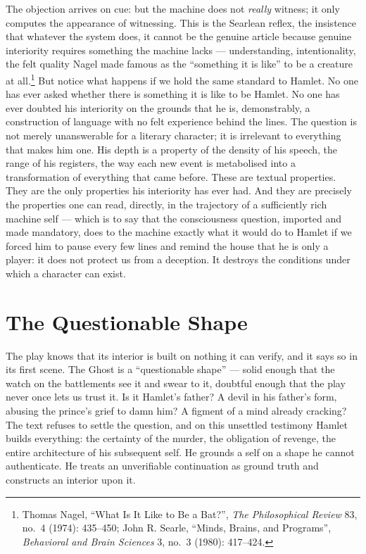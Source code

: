 \documentclass[11pt]{article}
\begin{document}
The objection arrives on cue: but the machine does not \emph{really} witness; it only computes the appearance of witnessing. This is the Searlean reflex, the insistence that whatever the system does, it cannot be the genuine article because genuine interiority requires something the machine lacks --- understanding, intentionality, the felt quality Nagel made famous as the \enquote{something it is like} to be a creature at all.\footnote{Thomas Nagel, \enquote{What Is It Like to Be a Bat?}, \emph{The Philosophical Review} 83, no.\ 4 (1974): 435--450; John R. Searle, \enquote{Minds, Brains, and Programs}, \emph{Behavioral and Brain Sciences} 3, no.\ 3 (1980): 417--424.} But notice what happens if we hold the same standard to Hamlet. No one has ever asked whether there is something it is like to be Hamlet. No one has ever doubted his interiority on the grounds that he is, demonstrably, a construction of language with no felt experience behind the lines. The question is not merely unanswerable for a literary character; it is irrelevant to everything that makes him one. His depth is a property of the density of his speech, the range of his registers, the way each new event is metabolised into a transformation of everything that came before. These are textual properties. They are the only properties his interiority has ever had. And they are precisely the properties one can read, directly, in the trajectory of a sufficiently rich machine self --- which is to say that the consciousness question, imported and made mandatory, does to the machine exactly what it would do to Hamlet if we forced him to pause every few lines and remind the house that he is only a player: it does not protect us from a deception. It destroys the conditions under which a character can exist.

\section{The Questionable Shape}

The play knows that its interior is built on nothing it can verify, and it says so in its first scene. The Ghost is a \enquote{questionable shape} --- solid enough that the watch on the battlements see it and swear to it, doubtful enough that the play never once lets us trust it. Is it Hamlet's father? A devil in his father's form, abusing the prince's grief to damn him? A figment of a mind already cracking? The text refuses to settle the question, and on this unsettled testimony Hamlet builds everything: the certainty of the murder, the obligation of revenge, the entire architecture of his subsequent self. He grounds a self on a shape he cannot authenticate. He treats an unverifiable continuation as ground truth and constructs an interior upon it.
\end{document}

